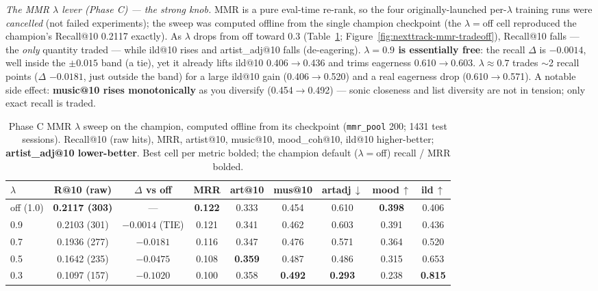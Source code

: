 \documentclass[11pt]{article}
\newcommand{\best}[1]{\textbf{#1}}
\begin{document}
\emph{The MMR $\lambda$ lever (Phase C) --- the strong knob.} MMR is a pure
eval-time re-rank, so the four originally-launched per-$\lambda$ training runs were
\emph{cancelled} (not failed experiments); the sweep was computed offline from the
single champion checkpoint (the $\lambda{=}$off cell reproduced the champion's
Recall@10 \num{0.2117} exactly). As $\lambda$ drops from off toward \num{0.3}
(Table~\ref{tab:mmr-sweep}; Figure~\ref{fig:nexttrack-mmr-tradeoff}), Recall@10 falls
--- the \emph{only} quantity traded --- while ild@10 rises and artist\_adj@10 falls
(de-eagering). \textbf{$\lambda{=}\num{0.9}$ is essentially free}: the recall
$\Delta$ is $-\num{0.0014}$, well inside the $\pm\num{0.015}$ band (a tie), yet it
already lifts ild@10 \num{0.406}$\to$\num{0.436} and trims eagerness
\num{0.610}$\to$\num{0.603}. \textbf{$\lambda\approx\num{0.7}$} trades $\sim$2 recall
points ($\Delta$ $-\num{0.0181}$, just outside the band) for a large ild@10 gain
(\num{0.406}$\to$\num{0.520}) and a real eagerness drop
(\num{0.610}$\to$\num{0.571}). A notable side effect: \textbf{music@10 rises
monotonically} as you diversify (\num{0.454}$\to$\num{0.492}) --- sonic closeness and
list diversity are not in tension; only exact recall is traded.

\begin{table}[ht]
  \centering
  \caption{Phase C MMR $\lambda$ sweep on the champion, computed offline from its
  checkpoint (\texttt{mmr\_pool} \num{200}; \num{1431} test sessions). Recall@10 (raw
  hits), MRR, artist@10, music@10, mood\_coh@10, ild@10 higher-better;
  \textbf{artist\_adj@10 lower-better}. Best cell per metric bolded; the champion
  default ($\lambda{=}$off) recall / MRR bolded.}
  \label{tab:mmr-sweep}
  {\footnotesize\setlength{\tabcolsep}{4pt}\begin{tabular}{lcccccccc}
    \toprule
    $\lambda$ & R@10 (raw) & $\Delta$ vs off & MRR & art@10 & mus@10 & artadj\,$\downarrow$ & mood\,$\uparrow$ & ild\,$\uparrow$ \\
    \midrule
    off (1.0) & \best{0.2117 (303)} & --- & \best{0.122} & 0.333 & 0.454 & 0.610 & \best{0.398} & 0.406 \\
    0.9 & 0.2103 (301) & $-0.0014$ (TIE) & 0.121 & 0.341 & 0.462 & 0.603 & 0.391 & 0.436 \\
    0.7 & 0.1936 (277) & $-0.0181$ & 0.116 & 0.347 & 0.476 & 0.571 & 0.364 & 0.520 \\
    0.5 & 0.1642 (235) & $-0.0475$ & 0.108 & \best{0.359} & 0.487 & 0.486 & 0.315 & 0.653 \\
    0.3 & 0.1097 (157) & $-0.1020$ & 0.100 & 0.358 & \best{0.492} & \best{0.293} & 0.238 & \best{0.815} \\
    \bottomrule
  \end{tabular}}
\end{table}
\end{document}
